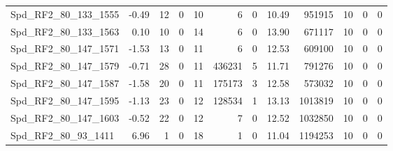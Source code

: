 \begin{longtable}[c]{@{}lrrrrrrrrrrr@{}}
Spd\_RF2\_80\_133\_1555       & -0.49                  & 12                      & 0                       & 10                     & 6                       & 0                       & 10.49                   & 951915                   & 10                       & 0                        & 0                        \\
Spd\_RF2\_80\_133\_1563       & 0.10                   & 10                      & 0                       & 14                     & 6                       & 0                       & 13.90                   & 671117                   & 10                       & 0                        & 0                        \\
Spd\_RF2\_80\_147\_1571       & -1.53                  & 13                      & 0                       & 11                     & 6                       & 0                       & 12.53                   & 609100                   & 10                       & 0                        & 0                        \\
Spd\_RF2\_80\_147\_1579       & -0.71                  & 28                      & 0                       & 11                     & 436231                  & 5                       & 11.71                   & 791276                   & 10                       & 0                        & 0                        \\
Spd\_RF2\_80\_147\_1587       & -1.58                  & 20                      & 0                       & 11                     & 175173                  & 3                       & 12.58                   & 573032                   & 10                       & 0                        & 0                        \\
Spd\_RF2\_80\_147\_1595       & -1.13                  & 23                      & 0                       & 12                     & 128534                  & 1                       & 13.13                   & 1013819                  & 10                       & 0                        & 0                        \\
Spd\_RF2\_80\_147\_1603       & -0.52                  & 22                      & 0                       & 12                     & 7                       & 0                       & 12.52                   & 1032850                  & 10                       & 0                        & 0                        \\
Spd\_RF2\_80\_93\_1411        & 6.96                   & 1                       & 0                       & 18                     & 1                       & 0                       & 11.04                   & 1194253                  & 10                       & 0                        & 0                        \\

\end{longtable}

